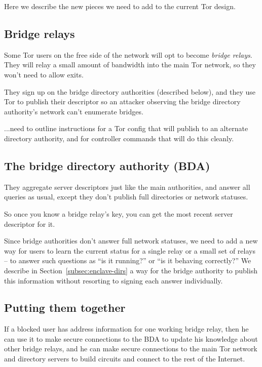 \documentclass{llncs}
\begin{document}
Here we describe the new pieces we need to add to the current Tor design.

\subsection{Bridge relays}

Some Tor users on the free side of the network will opt to become
\emph{bridge relays}. They will relay a small amount of bandwidth into
the main Tor network, so they won't need to allow exits.

They sign up on the bridge directory authorities (described below),
and they use Tor to publish their descriptor so an attacker observing
the bridge directory authority's network can't enumerate bridges.

...need to outline instructions for a Tor config that will publish
to an alternate directory authority, and for controller commands
that will do this cleanly.

\subsection{The bridge directory authority (BDA)}

They aggregate server descriptors just like the main authorities, and
answer all queries as usual, except they don't publish full directories
or network statuses.

So once you know a bridge relay's key, you can get the most recent
server descriptor for it.

Since bridge authorities don't answer full network statuses, we
need to add a new way for users to learn the current status for a
single relay or a small set of relays -- to answer such questions as
``is it running?''  or ``is it behaving correctly?'' We describe in
Section~\ref{subsec:enclave-dirs} a way for the bridge authority to
publish this information without resorting to signing each answer
individually.

\subsection{Putting them together}

If a blocked user has address information for one working bridge relay,
then he can use it to make secure connections to the BDA to update his
knowledge about other bridge
relays, and he can make secure connections to the main Tor network
and directory servers to build circuits and connect to the rest of
the Internet.
\end{document}
